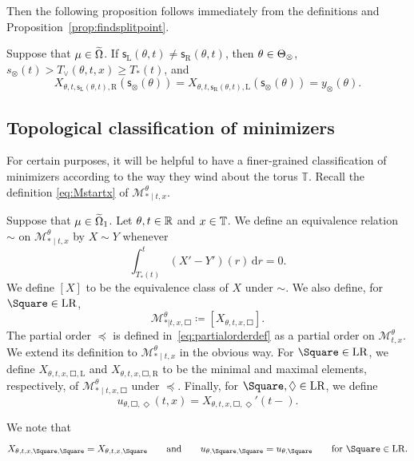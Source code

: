 \documentclass[AHL,Unicode,longabstracts]{cedram}
\newcommand*\sfs{\mathsf{s}}
\newcommand*\scM{\mathscr{M}}
\newcommand*\TT{\mathbb{T}}
\newcommand*\RR{\mathbb{R}}
\newcommand*\dif{\mathrm{d}}
\newcommand*\Left{\mathrm{L}}
\newcommand*\Right{\mathrm{R}}
\newcommand*\LR{\mathrm{LR}}
\let\oldin\in
\renewcommand{\in}{\mathchoice{\oldin}{\oldin}{\,\oldin\,}{\,\oldin\,}}
\newcommand*\TT{\mathbb{T}}
\newcommand*\RR{\mathbb{R}}
\begin{document}
Then the following proposition follows immediately from the definitions and Proposition~\ref{prop:findsplitpoint}.

\begin{prop}\label{prop:ifnotequalthenwherecollide}
Suppose that $\mu\in\widetilde{\Omega}$. If $\sfs_{\Left}(\theta,t)\ne\sfs_{\Right}(\theta,t)$, then $\theta\in\Theta_{\otimes}$, $s_{\otimes}(t)>T_{\vee}(\theta,t,x)\ge T_{*}(t)$, and
\[
X_{\theta,t,\sfs_{\Left}(\theta,t),\Right}(\sfs_{\otimes}(\theta))=X_{\theta,t,\sfs_{\Right}(\theta,t),\Left}(\sfs_{\otimes}(\theta))=y_{\otimes}(\theta).
\]
\end{prop}


\subsection{Topological classification of minimizers}

For certain purposes, it will be helpful to have a finer-grained classification of minimizers according to the way they wind about the torus $\TT$. Recall the definition \eqref{eq:Mstartx} of $\scM_{*\mid t,x}^{\theta}$.

\begin{defi}\label{def:equiv-relation}
Suppose that $\mu\in\widetilde{\Omega}_{1}$. Let $\theta,t\in\RR$ and $x\in\TT$. We define an equivalence relation $\sim$ on $\scM_{*\mid t,x}^{\theta}$ by $X\sim Y$ whenever
\[
\int_{T_{*}(t)}^{t}(X'-Y')(r)\,\dif r=0.
\]
We define $[X]$ to be the equivalence class of $X$ under $\sim$. We also define, for $\Square\in\LR$,
\[
\scM_{*|t,x,\Square}^{\theta}\coloneqq[X_{\theta,t,x,\Square}].
\]
The partial order $\preccurlyeq$ is defined in~\eqref{eq:partialorderdef} as a partial order on $\scM_{t,x}^{\theta}$. We extend its definition to $\scM_{*\mid t,x}^{\theta}$ in the obvious way. For $\Square\in\LR$, we define $X_{\theta,t,x,\Square,\Left}$ and $X_{\theta,t,x,\Square,\Right}$ to be the minimal and maximal elements, respectively, of $\scM_{*\mid t,x,\Square}^{\theta}$ under $\preccurlyeq$. Finally, for $\Square,\Diamond\in\LR$, we define
\begin{equation}\label{eq:usquarediamonddef}
u_{\theta,\Square,\Diamond}(t,x)=X_{\theta,t,x,\Square,\Diamond}'(t-).
\end{equation}
\end{defi}

We note that
\begin{equation}\label{eq:leftleftrightright}
X_{\theta,t,x,\Square,\Square}=X_{\theta,t,x,\Square}\qquad\text{and}\qquad u_{\theta,\Square,\Square}=u_{\theta,\Square}\qquad\text{for }\Square\in\LR.
\end{equation}
\end{document}
